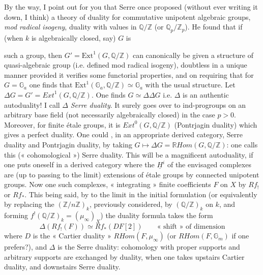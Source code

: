 \documentclass[11pt,a4paper]{article}
\begin{document}
By the way, I point out for you that Serre once proposed (without ever writing it down, I think) a theory of duality for commutative unipotent algebraic groups, \emph{mod radical isogeny}, duality with values in $\mathbb{Q}/\mathbb{Z}$ (or $\mathbb{Q}_p/\mathbb{Z}_p$). He found that if (when $k$ is algebraically closed, say) $G$ is

such a group, then $G' = \mathrm{Ext}^1(G, \mathbb{Q}/\mathbb{Z})$ can canonically be given a structure of quasi-algebraic group (i.e. defined mod radical isogeny), doubtless in a unique manner provided it verifies some functorial properties, and on requiring that for $G = \mathbb{G}_a$ one finds that $\mathrm{Ext}^1(\mathbb{G}_a, \mathbb{Q}/\mathbb{Z}) \simeq \mathbb{G}_a$ with the usual structure. Let $\Delta G = G' = \mathit{Ext}^1(G, \mathbb{Q}/\mathbb{Z})$. One finds $G \simeq \Delta\Delta G$ i.e. $\Delta$ is an authentic autoduality! I call $\Delta$ \emph{Serre duality}. It surely goes over to ind-progroups on an arbitrary base field (not necessarily algebraically closed) in the case $p > 0$. Moreover, for finite étale groups, it is $\mathit{Ext}^0(G, \mathbb{Q}/\mathbb{Z})$ (Pontrjagin duality) which gives a perfect duality. One could  , in an appropriate derived category, Serre duality and Pontrjagin duality, by taking $G \longmapsto \Delta G = \mathbb{R}\mathit{Hom}(G, \mathbb{Q}/\mathbb{Z})$: one calls this (« cohomological ») Serre duality. This will be a magnificent autoduality, if one puts oneself in a derived category where the $\underline{H}^i$ of the envisaged complexes are (up to passing to the limit) extensions of étale groups by connected unipotent groups. Now one   such complexes,   « integrating » finite coefficients $F$ on $X$ by $Rf_!$ or $Rf_*$. This being said, by   to the limit in the initial formulation (or equivalently by replacing the $(\mathbb{Z}/n\mathbb{Z})_k$, previously considered, by $(\mathbb{Q}/\mathbb{Z})_k$ on $k$, and forming $f^!(\mathbb{Q}/\mathbb{Z})_k = (\mu_\infty)_X$) the duality formula takes the form
\[
\Delta(Rf_!(F)) \simeq Rf_*(DF[2]) \qquad \text{« shift » of dimension}
\]
where $D$ is the « Cartier duality » $R\mathit{Hom}(F, \mu_\infty)$ (or $R\mathit{Hom}(F, \mathbb{G}_m)$ if one prefers?), and $\Delta$ is the Serre duality: cohomology with proper supports and  arbitrary supports are exchanged by duality, when one takes upstairs Cartier duality, and downstairs Serre duality.
\end{document}
